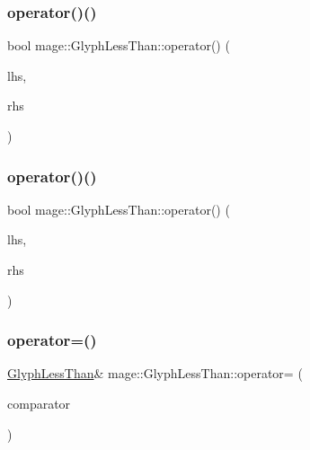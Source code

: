 \hypertarget{structmage_1_1_glyph_less_than_a2a716c7633165ef0382300a6a800766a}{}\label{structmage_1_1_glyph_less_than_a2a716c7633165ef0382300a6a800766a} 
\subsubsection{\texorpdfstring{operator()()}{operator()()}\hspace{0.1cm}{\footnotesize\ttfamily [2/3]}}
{\footnotesize\ttfamily bool mage\+::\+Glyph\+Less\+Than\+::operator() (\begin{DoxyParamCaption}\item[{const \hyperlink{structmage_1_1_glyph}{Glyph} \&}]{lhs,  }\item[{wchar\+\_\+t}]{rhs }\end{DoxyParamCaption})}

\hypertarget{structmage_1_1_glyph_less_than_a213602e0f23118c87c3b982c42c35479}{}\label{structmage_1_1_glyph_less_than_a213602e0f23118c87c3b982c42c35479} 
\subsubsection{\texorpdfstring{operator()()}{operator()()}\hspace{0.1cm}{\footnotesize\ttfamily [3/3]}}
{\footnotesize\ttfamily bool mage\+::\+Glyph\+Less\+Than\+::operator() (\begin{DoxyParamCaption}\item[{wchar\+\_\+t}]{lhs,  }\item[{const \hyperlink{structmage_1_1_glyph}{Glyph} \&}]{rhs }\end{DoxyParamCaption})}

\hypertarget{structmage_1_1_glyph_less_than_aa3de6a126c3a70ad452a17b37709eca6}{}\label{structmage_1_1_glyph_less_than_aa3de6a126c3a70ad452a17b37709eca6} 
\subsubsection{\texorpdfstring{operator=()}{operator=()}\hspace{0.1cm}{\footnotesize\ttfamily [1/2]}}
{\footnotesize\ttfamily \hyperlink{structmage_1_1_glyph_less_than}{Glyph\+Less\+Than}\& mage\+::\+Glyph\+Less\+Than\+::operator= (\begin{DoxyParamCaption}\item[{const \hyperlink{structmage_1_1_glyph_less_than}{Glyph\+Less\+Than} \&}]{comparator }\end{DoxyParamCaption})\hspace{0.3cm}{\ttfamily [default]}}

